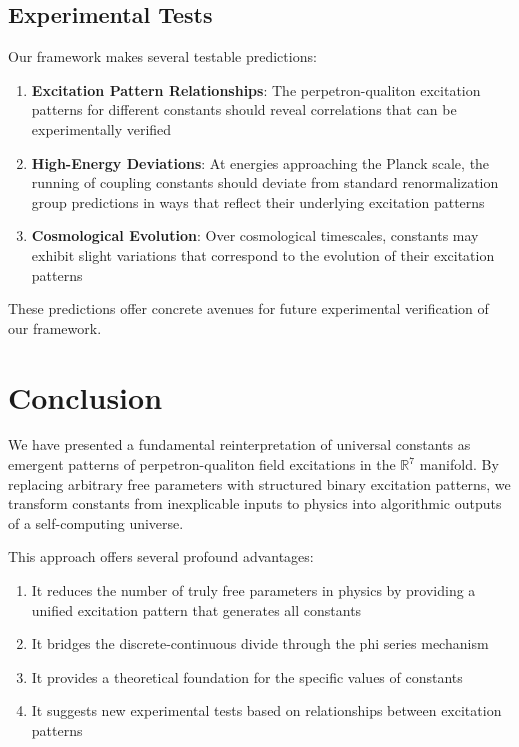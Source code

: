\documentclass{article}
\begin{document}
\subsection{Experimental Tests}

Our framework makes several testable predictions:

\begin{enumerate}
\item \textbf{Excitation Pattern Relationships}: The perpetron-qualiton excitation patterns for different constants should reveal correlations that can be experimentally verified
    
\item \textbf{High-Energy Deviations}: At energies approaching the Planck scale, the running of coupling constants should deviate from standard renormalization group predictions in ways that reflect their underlying excitation patterns
    
\item \textbf{Cosmological Evolution}: Over cosmological timescales, constants may exhibit slight variations that correspond to the evolution of their excitation patterns
\end{enumerate}

These predictions offer concrete avenues for future experimental verification of our framework.

\section{Conclusion}

We have presented a fundamental reinterpretation of universal constants as emergent patterns of perpetron-qualiton field excitations in the $\mathbb{R}^7$ manifold. By replacing arbitrary free parameters with structured binary excitation patterns, we transform constants from inexplicable inputs to physics into algorithmic outputs of a self-computing universe.

This approach offers several profound advantages:

\begin{enumerate}
\item It reduces the number of truly free parameters in physics by providing a unified excitation pattern that generates all constants
\item It bridges the discrete-continuous divide through the phi series mechanism
\item It provides a theoretical foundation for the specific values of constants
\item It suggests new experimental tests based on relationships between excitation patterns
\end{enumerate}
\end{document}
